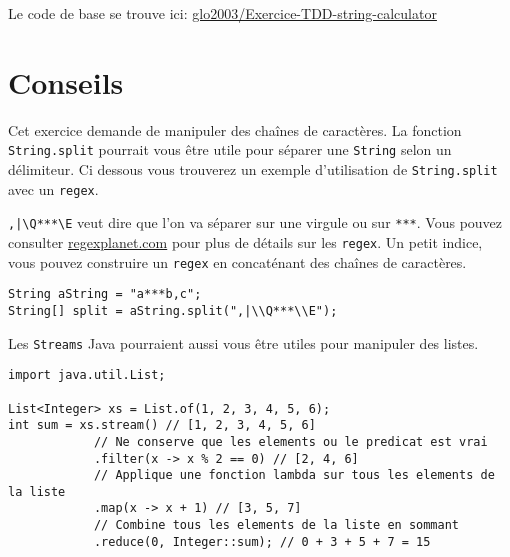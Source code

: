 \documentclass[french]{article}
\begin{document}
Le code de base se trouve ici: \href{https://github.com/glo2003/Exercice-TDD-string-calculator}{glo2003/Exercice-TDD-string-calculator}

\section{Conseils}

Cet exercice demande de manipuler des chaînes de caractères. La fonction \texttt{String.split} pourrait vous être utile pour séparer une \texttt{String} selon un délimiteur. Ci dessous vous trouverez un exemple d'utilisation de \texttt{String.split} avec un \texttt{regex}.

\texttt{,|\textbackslash Q***\textbackslash E} veut dire que l'on va séparer sur une virgule ou sur \texttt{***}. Vous pouvez consulter \href{https://www.regexplanet.com/support/javadoc.html}{regexplanet.com} pour plus de détails sur les \texttt{regex}. Un petit indice, vous pouvez construire un \texttt{regex} en concaténant des chaînes de caractères.

\begin{lstlisting}
String aString = "a***b,c";
String[] split = aString.split(",|\\Q***\\E");
\end{lstlisting}

\noindent Les \texttt{Streams} Java pourraient aussi vous être utiles pour manipuler des listes.

\begin{lstlisting}
import java.util.List;

List<Integer> xs = List.of(1, 2, 3, 4, 5, 6);
int sum = xs.stream() // [1, 2, 3, 4, 5, 6]
            // Ne conserve que les elements ou le predicat est vrai
            .filter(x -> x % 2 == 0) // [2, 4, 6]
            // Applique une fonction lambda sur tous les elements de la liste
            .map(x -> x + 1) // [3, 5, 7]
            // Combine tous les elements de la liste en sommant
            .reduce(0, Integer::sum); // 0 + 3 + 5 + 7 = 15
\end{lstlisting}
\end{document}
